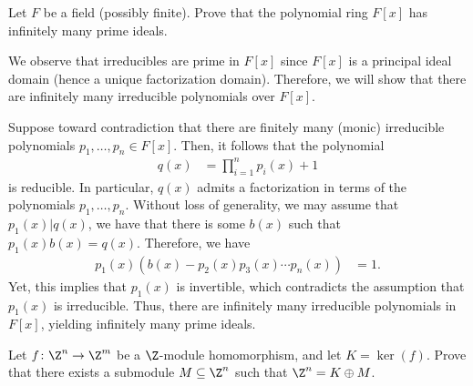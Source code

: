 \documentclass[10pt]{mypackage}
\begin{document}
\begin{problem}[Problem 3]
  Let $F$ be a field (possibly finite). Prove that the polynomial ring $F[x]$ has infinitely many prime ideals.
\end{problem}
\begin{solution}
  We observe that irreducibles are prime in $F[x]$ since $F[x]$ is a principal ideal domain (hence a unique factorization domain). Therefore, we will show that there are infinitely many irreducible polynomials over $F[x]$.

  Suppose toward contradiction that there are finitely many (monic) irreducible polynomials $p_1,\dots,p_n\in F[x]$. Then, it follows that the polynomial
  \begin{align*}
    q(x) &= \prod_{i=1}^{n}p_i(x) + 1
  \end{align*}
  is reducible. In particular, $q(x)$ admits a factorization in terms of the polynomials $p_1,\dots,p_n$. Without loss of generality, we may assume that $p_1(x) | q(x)$, we have that there is some $b(x)$ such that $p_1(x)b(x) = q(x)$. Therefore, we have
  \begin{align*}
    p_1(x)\left( b(x) - p_2(x)p_3(x)\cdots p_n(x) \right) &= 1.
  \end{align*}
  Yet, this implies that $p_1(x)$ is invertible, which contradicts the assumption that $p_1(x)$ is irreducible. Thus, there are infinitely many irreducible polynomials in $F[x]$, yielding infinitely many prime ideals.
\end{solution}
\begin{problem}[Problem 4]
  Let $f\colon \Z^{n}\rightarrow \Z^{m}$ be a $\Z$-module homomorphism, and let $K = \ker\left( f \right)$. Prove that there exists a submodule $M\subseteq \Z^{n}$ such that $\Z^{n}= K\oplus M$.
\end{problem}
\end{document}
